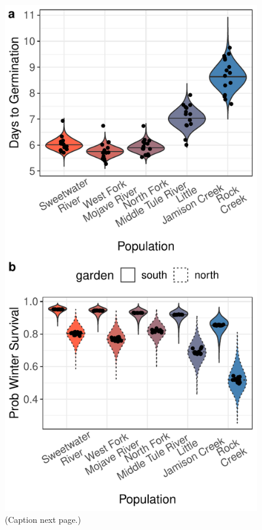 \documentclass[
  12pt,
]{article}
\begin{document}
\begin{figure}[ht]
  \centering
  \includegraphics[width=\textwidth]{figures/mean-traits.pdf}
  \caption{(Caption next page.)}
  \label{fig:mean-traits}
\end{figure}
\addtocounter{figure}{-1}
\end{document}
